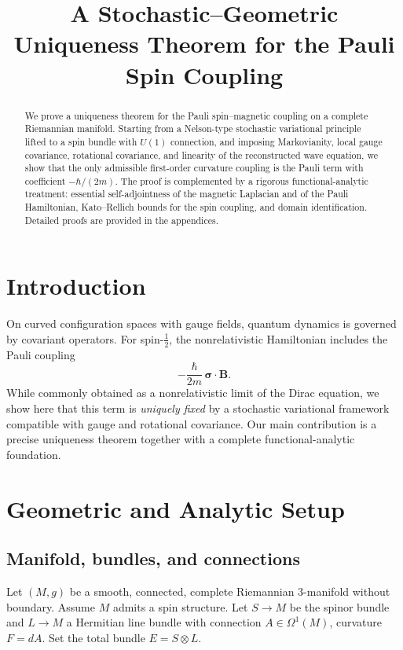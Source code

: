 \documentclass[11pt]{article}
\title{\textbf{A Stochastic--Geometric Uniqueness Theorem for the Pauli Spin Coupling}}
\author{}
\date{}
\begin{document}
\maketitle

\begin{abstract}
We prove a uniqueness theorem for the Pauli spin--magnetic coupling on a complete Riemannian manifold. Starting from a Nelson-type stochastic variational principle lifted to a spin bundle with $U(1)$ connection, and imposing Markovianity, local gauge covariance, rotational covariance, and linearity of the reconstructed wave equation, we show that the only admissible first-order curvature coupling is the Pauli term with coefficient $-\hbar/(2m)$. The proof is complemented by a rigorous functional-analytic treatment: essential self-adjointness of the magnetic Laplacian and of the Pauli Hamiltonian, Kato--Rellich bounds for the spin coupling, and domain identification. Detailed proofs are provided in the appendices.
\end{abstract}

\tableofcontents

\section{Introduction}

On curved configuration spaces with gauge fields, quantum dynamics is governed by covariant operators. For spin-$\tfrac12$, the nonrelativistic Hamiltonian includes the Pauli coupling
\[
-\frac{\hbar}{2m}\,\bm{\sigma}\cdot \bm{B}.
\]
While commonly obtained as a nonrelativistic limit of the Dirac equation, we show here that this term is \emph{uniquely fixed} by a stochastic variational framework compatible with gauge and rotational covariance. Our main contribution is a precise uniqueness theorem together with a complete functional-analytic foundation.

\section{Geometric and Analytic Setup}

\subsection{Manifold, bundles, and connections}

Let $(M,g)$ be a smooth, connected, complete Riemannian $3$-manifold without boundary. Assume $M$ admits a spin structure. Let $S\to M$ be the spinor bundle and $L\to M$ a Hermitian line bundle with connection $A\in \Omega^1(M)$, curvature $F=dA$. Set the total bundle $E=S\otimes L$.
\end{document}
